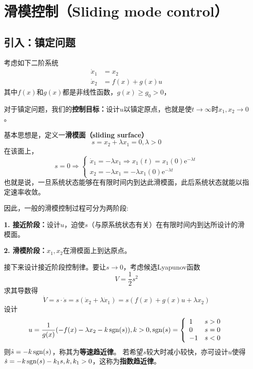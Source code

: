 \newpage
\section{滑模控制（Sliding mode control）}\label{5Cref}

\subsection{引入：镇定问题}

 考虑如下二阶系统
 \begin{equation}
   \begin{aligned}
    \dot{x}_1 & = x_2\\
    \dot{x}_2 & = f (x) + g (x) u
    \end{aligned}\label{Sys:sliding_mode}
 \end{equation}
  其中$f (x)$和$g (x)$都是非线性函数，$g (x) \geq g_0 > 0$，
  
  对于镇定问题，我们的\textbf{控制目标：}设计$u$以镇定原点，也就是使$t
  \rightarrow \infty $时$ x_1, x_2 \rightarrow 0$。
  
  基本思想是，定义一\textbf{滑模面（sliding surface）}\[s = x_2 + \lambda x_1 = 0,
  \lambda > 0\]
  在该面上， \[ s = 0 \Rightarrow \left\{\begin{array}{l}
       \dot{x}_1 = - \lambda x_1 \Rightarrow x_1 (t) = x_1 (0) \mathrm{e}^{- \lambda t}\\
       x_2 = - \lambda x_1 = - \lambda x_1 (0) \mathrm{e}^{- \lambda  t}
     \end{array}\right. \]
     也就是说，一旦系统状态能够在有限时间内到达此滑模面，此后系统状态就能以指定速率收敛。
  
  因此，一般的滑模控制过程可分为两阶段:
  
  \textbf{1. 接近阶段：}设计$u$，迫使$s$（与原系统状态有关）在有限时间内到达所设计的滑模面。
  
  \textbf{2. 滑模阶段：}$x_1, x_2$在滑模面上到达原点。
  
  接下来设计接近阶段控制律。要让$s\to 0$，考虑候选Lyapunov函数\[V = \frac{1}{2} s^2\]
  求其导数得
  \[ \dot{V} = s \cdot \dot{s}=s(\dot{x}_2 + \lambda \dot{x}_1) = s (f (x) + g (x) u + \lambda x_2) \]
  设计\[u = \frac{1}{g (x)} (- f (x) - \lambda x_2 - k \operatorname{sgn} (s)),k > 0,\operatorname{sgn}(s) = \left\{\begin{array}{ll}
  1 & s > 0\\
  0 & s = 0\\
  - 1 & s < 0
\end{array}\right.\]
  则$\dot{s} = - k \operatorname{sgn} (s)$，称其为\textbf{等速趋近律}。
  若希望$s$较大时减小较快，亦可设计$u$使得$\dot{s}
  = - k \operatorname{sgn} (s) - k_1 s,k,k_1>0$，这称为\textbf{指数趋近律}。
  
